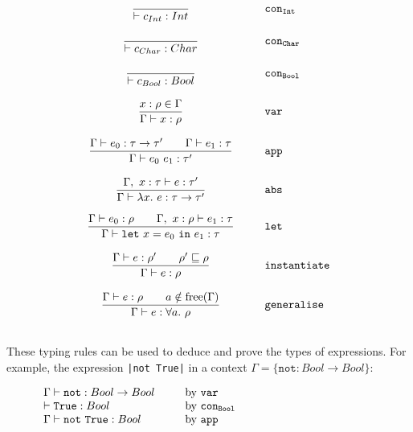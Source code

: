 \documentclass[a4paper,fleqn,oneside,12pt]{report}
\begin{document}
$$
\begin{array}{ccl}
  \displaystyle\frac{}{\vdash c_{Int} : Int} & \hspace{0.25cm} & \mathtt{con_{Int}}\\ \\
  \displaystyle\frac{}{\vdash c_{Char} : Char} & & \mathtt{con_{Char}}\\ \\
  \displaystyle\frac{}{\vdash c_{Bool} : Bool} & & \mathtt{con_{Bool}}\\ \\
  \displaystyle\frac{x : \rho \in \Gamma}{\Gamma \vdash x : \rho} & & \mathtt{var}\\ \\
  \displaystyle\frac{\Gamma \vdash e_0 : \tau \rightarrow \tau' \quad\quad \Gamma \vdash e_1 : \tau }{\Gamma \vdash e_0\ e_1 : \tau'} & & \mathtt{app}\\ \\
  \displaystyle\frac{\Gamma,\ x : \tau\vdash e : \tau'}{\Gamma \vdash \lambda x.\ e : \tau \rightarrow \tau'} & & \mathtt{abs}\\ \\
  \displaystyle\frac{\Gamma \vdash e_0 : \rho \quad\quad \Gamma,\ x:\rho \vdash e_1 : \tau}{\Gamma \vdash \mathtt{let}\ x = e_0\ \mathtt{in}\ e_1 : \tau} & & \mathtt{let}\\ \\
  \displaystyle\frac{\Gamma \vdash e : \rho' \quad\quad \rho' \sqsubseteq \rho}{\Gamma \vdash e : \rho} & & \mathtt{instantiate}\\ \\
  \displaystyle\frac{\Gamma \vdash e : \rho \quad\quad a \notin \text{free}(\Gamma)}{\Gamma \vdash e : \forall a.\ \rho} & & \mathtt{generalise}\\ \\
\end{array}
$$

These typing rules can be used to deduce and prove the types of expressions. For example, the expression \texttt{|not True|} in a context $\Gamma = \{ \mathtt{not} : Bool \rightarrow Bool \}$:

$$
\begin{array}{lclc}
  \Gamma \vdash \mathtt{not} : Bool \rightarrow Bool & \hspace{0.25cm} & \textrm{by}\ \mathtt{var}        & \hspace{4cm} \\
  \vdash \mathtt{True} : Bool                        &                 & \textrm{by}\ \mathtt{con_{Bool}} & \\
  \Gamma \vdash \mathtt{not\ True} : Bool            &                 & \textrm{by}\ \mathtt{app}        & \\
\end{array}
$$
\end{document}
